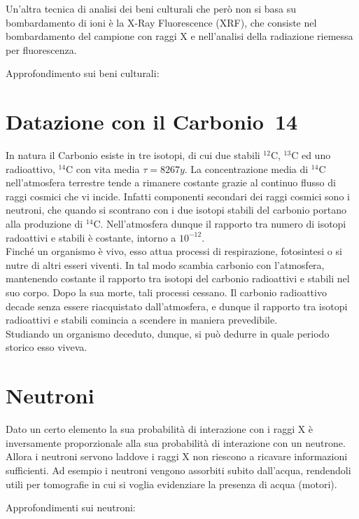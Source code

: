 Un'altra tecnica di analisi dei beni culturali che però non si basa su bombardamento di ioni è la X-Ray Fluorescence (XRF), che consiste nel bombardamento del campione con raggi X e nell'analisi della radiazione riemessa per fluorescenza.

Approfondimento sui beni culturali: \cite{Cultural}


\section{Datazione con il Carbonio~14}

In natura il Carbonio esiste in tre isotopi, di cui due stabili $^{12}\text{C}$, $^{13}\text{C}$ ed uno radioattivo, $^{14}\text{C}$ con vita media $\tau=8267y$.
La concentrazione media di $^{14}\text{C}$ nell'atmosfera terrestre tende a rimanere costante grazie al continuo flusso di raggi cosmici che vi incide. Infatti  componenti secondari dei raggi cosmici sono i neutroni, che quando si scontrano con i due isotopi stabili del carbonio portano alla produzione di $^{14}\text{C}$.
Nell'atmosfera dunque il rapporto tra numero di isotopi radoattivi e stabili è costante, intorno a $10^{-12}$. \\
Finché un organismo è vivo, esso attua processi di respirazione, fotosintesi o si nutre di altri esseri viventi. In tal modo scambia carbonio con l'atmosfera, mantenendo costante il rapporto tra isotopi del carbonio radioattivi e stabili nel suo corpo. Dopo la sua morte, tali processi cessano. Il carbonio radioattivo decade senza essere riacquistato dall'atmosfera, e dunque il rapporto tra isotopi radioattivi e stabili comincia a scendere in maniera prevedibile.\\
Studiando un organismo deceduto, dunque, si può dedurre in quale periodo storico esso viveva.

\section{Neutroni}

Dato un certo elemento la sua probabilità di interazione con i raggi X è inversamente proporzionale alla sua probabilità di interazione con un neutrone. Allora i neutroni servono laddove i raggi X non riescono a ricavare informazioni sufficienti.
Ad esempio i neutroni vengono assorbiti subito dall'acqua, rendendoli utili per tomografie in cui si voglia evidenziare la presenza di acqua (motori). 

Approfondimenti sui neutroni: \cite{Corvisiero} \cite{Assay}

